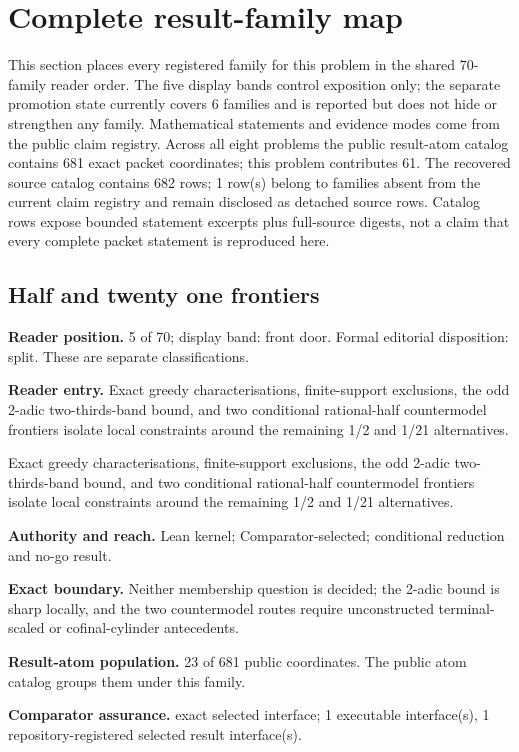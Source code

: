 \clearpage
\section{Complete result-family map}\label{sec:erdos-257-complete-family-map}

This section places every registered family for this problem in the shared 70-family reader order.  The five display bands control exposition only; the separate promotion state currently covers 6 families and is reported but does not hide or strengthen any family.  Mathematical statements and evidence modes come from the public claim registry.  Across all eight problems the public result-atom catalog contains 681 exact packet coordinates; this problem contributes 61.  The recovered source catalog contains 682 rows; 1 row(s) belong to families absent from the current claim registry and remain disclosed as detached source rows.  Catalog rows expose bounded statement excerpts plus full-source digests, not a claim that every complete packet statement is reproduced here.

\subsection{Half and twenty one frontiers}
\textbf{Reader position.} 5 of 70; display band: front door.  Formal editorial disposition: split.  These are separate classifications.

\textbf{Reader entry.} Exact greedy characterisations, finite-support exclusions, the odd 2-adic two-thirds-band bound, and two conditional rational-half countermodel frontiers isolate local constraints around the remaining 1/2 and 1/21 alternatives.

Exact greedy characterisations, finite-support exclusions, the odd 2-adic two-thirds-band bound, and two conditional rational-half countermodel frontiers isolate local constraints around the remaining 1/2 and 1/21 alternatives.

\textbf{Authority and reach.} Lean kernel; Comparator-selected; conditional reduction and no-go result.

\textbf{Exact boundary.} Neither membership question is decided; the 2-adic bound is sharp locally, and the two countermodel routes require unconstructed terminal-scaled or cofinal-cylinder antecedents.

\textbf{Result-atom population.} 23 of 681 public coordinates. The public atom catalog groups them under this family.

\textbf{Comparator assurance.} exact selected interface; 1 executable interface(s), 1 repository-registered selected result interface(s).

